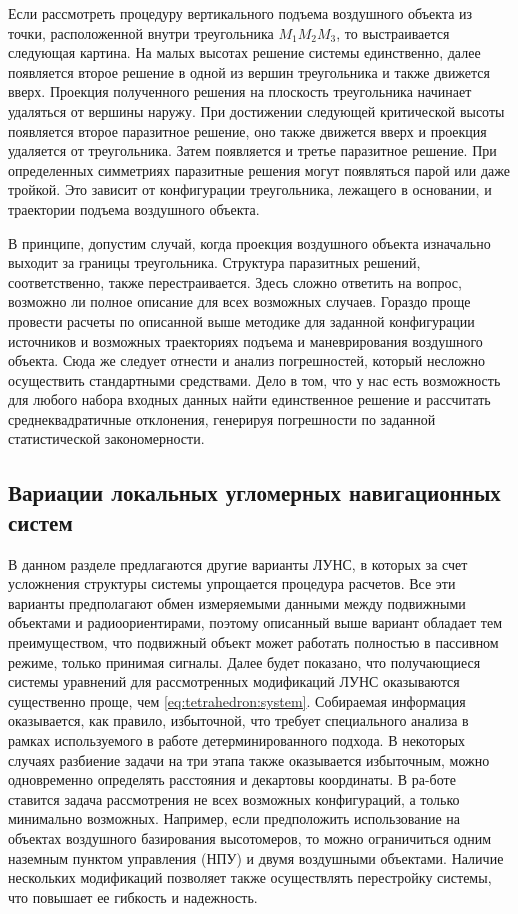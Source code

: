 \documentclass[../main.tex]{subfiles}
\begin{document}
Если рассмотреть процедуру вертикального подъема воздушного объекта из точки, расположенной внутри треугольника $M_1 M_2 M_3$, то выстраивается следующая картина. На малых высотах решение системы единственно, далее появляется второе решение в одной из вершин треугольника и также движется вверх. Проекция полученного решения на плоскость треугольника начинает удаляться от вершины наружу. При достижении следующей критической высоты появляется второе паразитное решение, оно также движется вверх и проекция удаляется от треугольника. Затем появляется и третье паразитное решение. При определенных симметриях паразитные решения могут появляться парой или даже тройкой. Это зависит от конфигурации треугольника, лежащего в основании, и траектории подъема воздушного объекта.

В принципе, допустим случай, когда проекция воздушного объекта изначально выходит за границы треугольника. Структура паразитных решений, соответственно, также перестраивается. Здесь сложно ответить на вопрос, возможно ли полное описание для всех возможных случаев. Гораздо проще провести расчеты по описанной выше методике для заданной конфигурации источников и возможных траекториях подъема и маневрирования воздушного объекта. Сюда же следует отнести и анализ погрешностей, который несложно осуществить стандартными средствами. Дело в том, что у нас есть возможность для любого набора входных данных найти единственное решение и рассчитать среднеквадратичные отклонения, генерируя погрешности по заданной статистической закономерности.


%
%
\subsection{Вариации локальных угломерных навигационных систем}
В данном разделе предлагаются другие варианты ЛУНС, в которых за счет усложнения структуры системы упрощается процедура расчетов. Все эти варианты предполагают обмен измеряемыми данными между подвижными объектами и радиоориентирами, поэтому описанный выше вариант обладает тем преимуществом, что подвижный объект может работать полностью в пассивном режиме, только принимая сигналы. Далее будет показано, что получающиеся системы уравнений для рассмотренных модификаций ЛУНС оказываются существенно проще, чем \eqref{eq:tetrahedron:system}. Собираемая информация оказывается, как правило, избыточной, что требует специального анализа в рамках используемого в работе детерминированного подхода. В некоторых случаях разбиение задачи на три этапа также оказывается избыточным, можно одновременно определять расстояния и декартовы координаты. В ра-боте ставится задача рассмотрения не всех возможных конфигураций, а только минимально возможных. Например, если предположить использование на объектах воздушного базирования высотомеров, то можно ограничиться одним наземным пунктом управления (НПУ) и двумя воздушными объектами. Наличие нескольких модификаций позволяет также осуществлять перестройку системы, что повышает ее гибкость и надежность.
\end{document}
